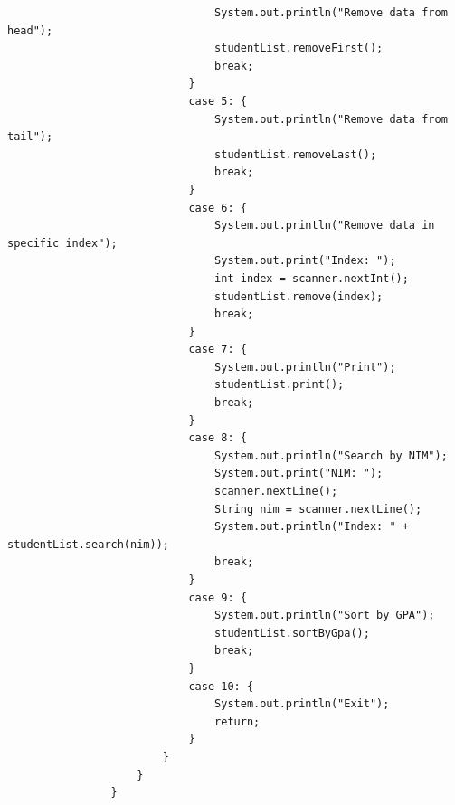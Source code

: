 \documentclass[12pt,titlepage]{article}
\begin{document}
\begin{enumerate}
{\begin{verbatim}
                                System.out.println("Remove data from head");
                                studentList.removeFirst();
                                break;
                            }
                            case 5: {
                                System.out.println("Remove data from tail");
                                studentList.removeLast();
                                break;
                            }
                            case 6: {
                                System.out.println("Remove data in specific index");
                                System.out.print("Index: ");
                                int index = scanner.nextInt();
                                studentList.remove(index);
                                break;
                            }
                            case 7: {
                                System.out.println("Print");
                                studentList.print();
                                break;
                            }
                            case 8: {
                                System.out.println("Search by NIM");
                                System.out.print("NIM: ");
                                scanner.nextLine();
                                String nim = scanner.nextLine();
                                System.out.println("Index: " + studentList.search(nim));
                                break;
                            }
                            case 9: {
                                System.out.println("Sort by GPA");
                                studentList.sortByGpa();
                                break;
                            }
                            case 10: {
                                System.out.println("Exit");
                                return;
                            }
                        }
                    }
                }


\end{verbatim}}
\end{enumerate}
\end{document}

